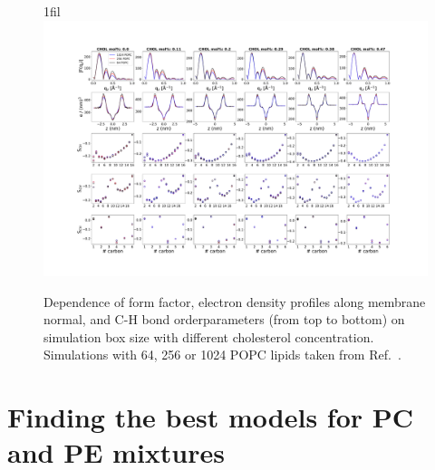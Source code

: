\documentclass[fleqn,10pt]{wlscirep}
\makeatletter
\newcommand*{\centerfloat}{%
  \parindent \z@
  \leftskip \z@ \@plus 1fil \@minus \textwidth
  \rightskip\leftskip
  \parfillskip \z@skip}
\makeatother
\begin{document}
\begin{figure}[!h]
    \centerfloat
    \includegraphics[width = 240mm]{Figures/SizeDependence.pdf}
    \caption{Dependence of form factor, electron density profiles along membrane normal, and C-H bond orderparameters (from top to bottom) on simulation box size with different cholesterol concentration. Simulations with 64, 256 or 1024 POPC lipids taken from Ref.~. }
    \label{fig:sizedependence}
\end{figure}


\pagebreak
\section{Finding the best models for PC and PE mixtures}
\end{document}
